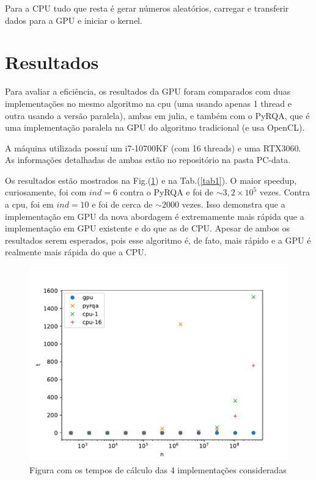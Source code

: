 \documentclass[12pt]{article}
\theoremstyle{definition}
\begin{document}
	Para a CPU tudo que resta é gerar números aleatórios, carregar e transferir dados para a GPU e iniciar o kernel. 

	\section{Resultados}
	
	Para avaliar a eficiência, os resultados da GPU foram comparados com duas implementações no mesmo algoritmo na cpu (uma usando apenas 1 thread e outra usando a versão paralela), ambas em julia, e também com o PyRQA, que é uma implementação paralela na GPU do algoritmo tradicional (e usa OpenCL). 
	
	A máquina utilizada possuí um i7-10700KF (com 16 threads) e uma RTX3060. As informações detalhadas de ambas estão no repositório na pasta PC-data. 
	
	Os resultados estão mostrados na Fig.(\ref{fig:times}) e na Tab.(\ref{tab1}). O maior speedup, curiosamente, foi com $ind=6$ contra o PyRQA e foi de $\sim 3,2\times10^5$ vezes. Contra a cpu, foi em $ind=10$ e foi de cerca de $\sim 2000$ vezes. Isso demonstra que a implementação em GPU da nova abordagem é extremamente mais rápida que a implementação em GPU existente e do que as de CPU. Apesar de ambos os resultados serem esperados, pois esse algoritmo é, de fato, mais rápido e a GPU é realmente mais rápida do que a CPU. 
	
	\begin{figure}
		\centering
		\includegraphics[width=0.7\linewidth]{times}
		\caption{Figura com os tempos de cálculo das 4 implementações consideradas}
		\label{fig:times}
	\end{figure}
	
\end{document}
